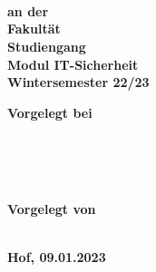 \begin{titlepage}
        \center
        \textbf{\Large \mytitle}\\[0.5cm]
        \textbf{\large \mysubtitle}\\[0.5cm]

    \vspace{3cm}
    \textbf{\Large \textls{\mydoctype}}\\[0.8cm]
    \textbf{an der \myuniname\\
    Fakultät \myfaculty\\
    Studiengang \mycourse\\
    Modul IT-Sicherheit\\
    Wintersemester 22/23}\\[0.5cm]
    \vfill\vfill\vfill

        \begin{minipage}{0.4\textwidth}
            \begin{flushleft}
                \textbf{Vorgelegt bei\\
                \mydocent{}\\
                \myunistreet{} \myuninumber{}\\
                \myunizip{} \myuniplace{}
                }
            \end{flushleft}
        \end{minipage}
~
    \begin{minipage}{0.4\textwidth}
        \begin{flushright}
            \textbf{
            Vorgelegt von\\
            \myname \\
            }
        \end{flushright}
    \end{minipage}
    \vfill
    \textbf{Hof, 09.01.2023}


\end{titlepage}
\restoregeometry